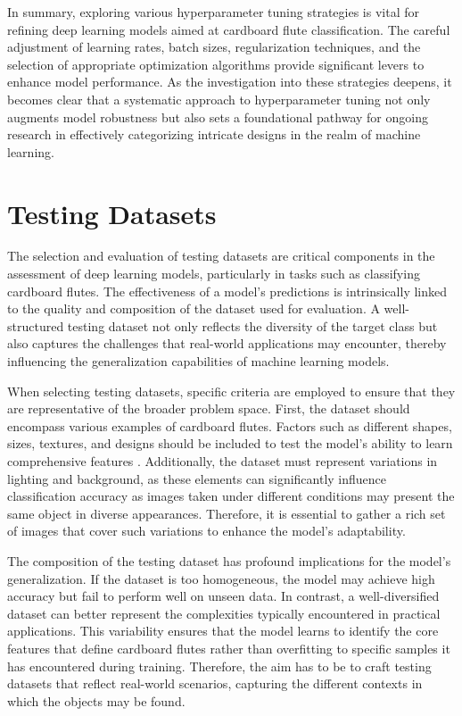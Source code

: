 In summary, exploring various hyperparameter tuning strategies is vital for refining deep learning models aimed at cardboard flute classification. The careful adjustment of learning rates, batch sizes, regularization techniques, and the selection of appropriate optimization algorithms provide significant levers to enhance model performance. As the investigation into these strategies deepens, it becomes clear that a systematic approach to hyperparameter tuning not only augments model robustness but also sets a foundational pathway for ongoing research in effectively categorizing intricate designs in the realm of machine learning.

\section{Testing Datasets}
The selection and evaluation of testing datasets are critical components in the assessment of deep learning models, particularly in tasks such as classifying cardboard flutes. The effectiveness of a model's predictions is intrinsically linked to the quality and composition of the dataset used for evaluation. A well-structured testing dataset not only reflects the diversity of the target class but also captures the challenges that real-world applications may encounter, thereby influencing the generalization capabilities of machine learning models.


When selecting testing datasets, specific criteria are employed to ensure that they are representative of the broader problem space. First, the dataset should encompass various examples of cardboard flutes. Factors such as different shapes, sizes, textures, and designs should be included to test the model's ability to learn comprehensive features \cite{smith2020dataset}. Additionally, the dataset must represent variations in lighting and background, as these elements can significantly influence classification accuracy as images taken under different conditions may present the same object in diverse appearances. Therefore, it is essential to gather a rich set of images that cover such variations to enhance the model's adaptability.


The composition of the testing dataset has profound implications for the model's generalization. If the dataset is too homogeneous, the model may achieve high accuracy but fail to perform well on unseen data. In contrast, a well-diversified dataset can better represent the complexities typically encountered in practical applications. This variability ensures that the model learns to identify the core features that define cardboard flutes rather than overfitting to specific samples it has encountered during training. Therefore, the aim has to be to craft testing datasets that reflect real-world scenarios, capturing the different contexts in which the objects may be found.


